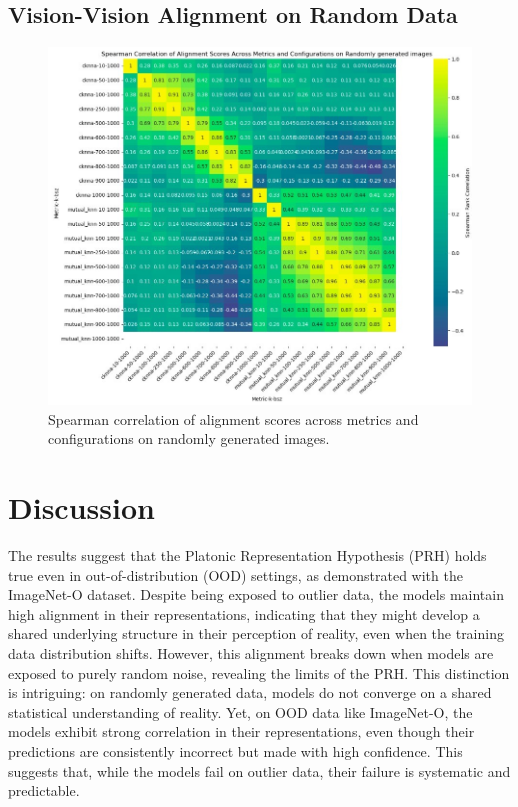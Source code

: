 \documentclass[10pt,a4paper]{article}
\begin{document}
\subsection{Vision-Vision Alignment on Random Data}
\begin{figure}[H]
    \centering
    \includegraphics[width=\textwidth]{prh_correlation_random.jpg}
    \caption{Spearman correlation of alignment scores across metrics and configurations on randomly generated images.}
    \label{fig:prh_correlation_random}
\end{figure}

\section{Discussion}
The results suggest that the Platonic Representation Hypothesis (PRH) holds true even in out-of-distribution (OOD) settings, as demonstrated with the ImageNet-O dataset. Despite being exposed to outlier data, the models maintain high alignment in their representations, indicating that they might develop a shared underlying structure in their perception of reality, even when the training data distribution shifts. However, this alignment breaks down when models are exposed to purely random noise, revealing the limits of the PRH. This distinction is intriguing: on randomly generated data, models do not converge on a shared statistical understanding of reality. Yet, on OOD data like ImageNet-O, the models exhibit strong correlation in their representations, even though their predictions are consistently incorrect but made with high confidence. This suggests that, while the models fail on outlier data, their failure is systematic and predictable.
\end{document}
